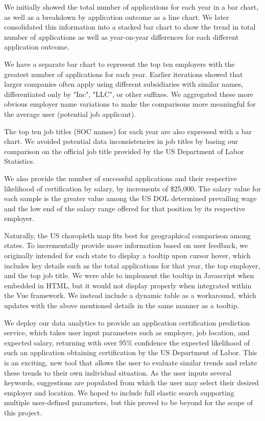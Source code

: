 \documentclass[sigconf]{acmart}
\begin{document}
We initially showed the total number of applications for each year in a bar chart, as well as a breakdown by application 
outcome as a line chart. We later consolidated this information into a stacked bar chart to show the trend in total number 
of applications as well as year-on-year differences for each different application outcome. 

We have a separate bar chart to represent the top ten employers with the greatest number of applications for each year. 
Earlier iterations showed that larger companies often apply using different subsidiaries with similar names, 
differentiated only by "Inc", "LLC", or other suffixes. We aggregated these more obvious employer name variations 
to make the comparisons more meaningful for the average user (potential job applicant). 

The top ten job titles (SOC names) for each year are also expressed with a bar chart. We avoided 
potential data inconsistencies in job titles by basing our comparison on the official job title provided 
by the US Department of Labor Statistics. 

We also provide the number of successful applications and their respective likelihood of certification 
by salary, by increments of \$25,000. The salary value for each sample is the greater value among 
the US DOL determined prevailing wage and the low end of the salary range offered for that position by 
its respective employer. 

Naturally, the US choropleth map fits best for geographical comparison among states. To incrementally 
provide more information based on user feedback, we originally intended for each state to display a 
tooltip upon cursor hover, which includes key details such as the total applications for that year, the top employer, and the top 
job title. We were able to implement the tooltip in Javascript when embedded in HTML, but it would not display 
properly when integrated within the Vue framework. We instead include a dynamic table as a workaround, which updates with 
the above mentioned details in the same manner as a tooltip. 

We deploy our data analytics to provide an application certification prediction service, 
which takes user input parameters such as employer, job location, 
and expected salary, returning with over 95\% confidence the expected likelihood of 
such an application obtaining certification by the US Department of Labor. 
This is an exciting, new tool that allows the user to evaluate similar trends and relate these 
trends to their own individual situation. 
As the user inputs several keywords, suggestions are populated from which the user may select 
their desired employer and location. We hoped to include full elastic search supporting multiple 
user-defined parameters, but this proved to be beyond for the scope of this project. 
\end{document}
